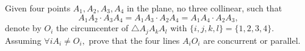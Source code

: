Given four points $ A_1, A_2, A_3, A_4$ in the plane, no three collinear, such that \[ A_1A_2 \cdot A_3 A_4 = A_1 A_3 \cdot A_2 A_4 = A_1 A_4 \cdot A_2 A_3,\] denote by $ O_i$ the circumcenter of $ \triangle A_j A_k A_l$ with $ \{i,j,k,l\} = \{1,2,3,4\}.$ Assuming $ \forall i A_i \neq O_i ,$ prove that the four lines $ A_iO_i$ are concurrent or parallel.